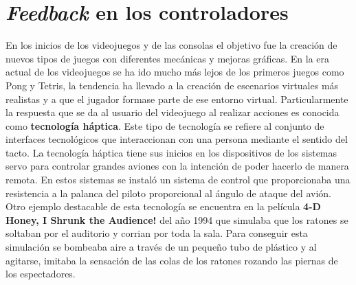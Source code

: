 \section{\textit{Feedback} en los controladores}

En los inicios de los videojuegos y de las consolas el objetivo fue la creaci\'on de nuevos tipos de juegos con diferentes mec\'anicas y mejoras gr\'aficas. En la era actual de los videojuegos se ha ido mucho m\'as lejos de los primeros juegos como Pong y Tetris, la tendencia ha llevado a la creaci\'on de escenarios virtuales m\'as realistas y a que el jugador formase parte de ese entorno virtual. Particularmente la respuesta que se da al usuario del videojuego al realizar acciones es conocida como \textbf{tecnolog\'ia h\'aptica}. Este tipo de tecnolog\'ia se refiere al conjunto de interfaces tecnol\'ogicos que interaccionan con una persona mediante el sentido del tacto. La tecnolog\'ia h\'aptica tiene sus inicios en los dispositivos de los sistemas servo para controlar grandes aviones con la intenci\'on de poder hacerlo de manera remota. En estos sistemas se instal\'o un sistema de control que proporcionaba una resistencia a la palanca del piloto proporcional al \'angulo de ataque del avi\'on. Otro ejemplo destacable de esta tecnolog\'ia se encuentra en la pel\'icula \textbf{4-D Honey, I Shrunk the Audience!} del a\~no 1994 que simulaba que los ratones se soltaban por el auditorio y corrian por toda la sala. Para conseguir esta simulaci\'on se bombeaba aire a trav\'es de un peque\~no tubo de pl\'astico y al agitarse, imitaba la sensaci\'on de las colas de los ratones rozando las piernas de los espectadores. \par

